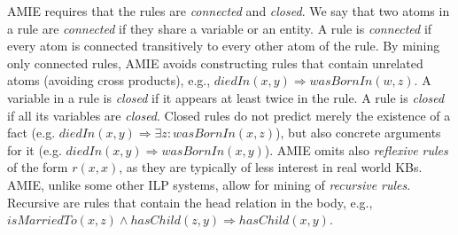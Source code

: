 AMIE requires that the rules are \emph{connected} and \emph{closed}. We say that two atoms in a rule are \emph{connected} if they share a variable or an entity.
A rule is \emph{connected} if every atom is connected transitively to every other atom of the rule.
By mining only connected rules, AMIE avoids constructing rules that contain unrelated atoms (avoiding cross products), e.g., $diedIn(x,y)\Rightarrow wasBornIn(w,z)$.
A variable in a rule is \emph{closed} if it appears at least twice in the rule. A rule is \emph{closed} if all its variables are \emph{closed}.
Closed rules do not predict merely the existence of a fact (e.g. $diedIn(x,y)\Rightarrow \exists z:wasBornIn(x,z)$),
but also concrete arguments for it (e.g. $diedIn(x,y)\Rightarrow wasBornIn(x,y)$).
AMIE omits also \emph{reflexive rules} of the form $r(x, x)$, as they are typically of less interest in real world KBs.
AMIE, unlike some other ILP systems, allow for mining of \emph{recursive rules}. Recursive are rules that contain the head relation in the body, 
e.g., $isMarriedTo(x,z) \wedge hasChild(z,y) \Rightarrow hasChild(x,y)$. 



